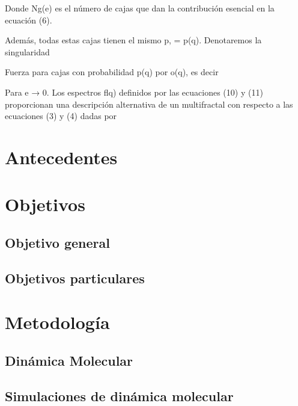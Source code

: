 \documentclass[11pt]{article}
\begin{document}
Donde Ng(e) es el número de cajas que dan la contribución esencial en la ecuación (6).

Además, todas estas cajas tienen el mismo p, = p(q). Denotaremos la singularidad

Fuerza para cajas con probabilidad p(q) por o(q), es decir

Para e → 0. Los espectros flq) definidos por las ecuaciones (10) y (11) proporcionan una descripción alternativa de un multifractal con respecto a las ecuaciones (3) y (4) dadas por

\section{Antecedentes}





\section{Objetivos}
\subsection{Objetivo general}



\subsection{Objetivos particulares}

\section{Metodología}
\subsection{Dinámica Molecular}\label{sec:md}
\subsection{Simulaciones de dinámica molecular}

\clearpage
\end{document}
